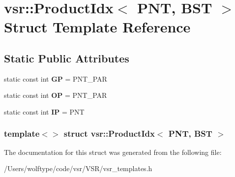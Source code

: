 \hypertarget{structvsr_1_1_product_idx_3_01_p_n_t_00_01_b_s_t_01_4}{\section{vsr\-:\-:Product\-Idx$<$ P\-N\-T, B\-S\-T $>$ Struct Template Reference}
\label{structvsr_1_1_product_idx_3_01_p_n_t_00_01_b_s_t_01_4}
}
\subsection*{Static Public Attributes}
\begin{DoxyCompactItemize}
\item 
\hypertarget{structvsr_1_1_product_idx_3_01_p_n_t_00_01_b_s_t_01_4_aa297f8d25ea923506bfd4a3e4ab93d47}{static const int {\bfseries G\-P} = P\-N\-T\-\_\-\-P\-A\-R}\label{structvsr_1_1_product_idx_3_01_p_n_t_00_01_b_s_t_01_4_aa297f8d25ea923506bfd4a3e4ab93d47}

\item 
\hypertarget{structvsr_1_1_product_idx_3_01_p_n_t_00_01_b_s_t_01_4_a15bab0795913887912a0db78eaa0cec8}{static const int {\bfseries O\-P} = P\-N\-T\-\_\-\-P\-A\-R}\label{structvsr_1_1_product_idx_3_01_p_n_t_00_01_b_s_t_01_4_a15bab0795913887912a0db78eaa0cec8}

\item 
\hypertarget{structvsr_1_1_product_idx_3_01_p_n_t_00_01_b_s_t_01_4_a38252ead405fa3ebb80f1334dcb94794}{static const int {\bfseries I\-P} = P\-N\-T}\label{structvsr_1_1_product_idx_3_01_p_n_t_00_01_b_s_t_01_4_a38252ead405fa3ebb80f1334dcb94794}

\end{DoxyCompactItemize}
\subsubsection*{template$<$$>$ struct vsr\-::\-Product\-Idx$<$ P\-N\-T, B\-S\-T $>$}



The documentation for this struct was generated from the following file\-:\begin{DoxyCompactItemize}
\item 
/\-Users/wolftype/code/vsr/\-V\-S\-R/vsr\-\_\-templates.\-h\end{DoxyCompactItemize}
